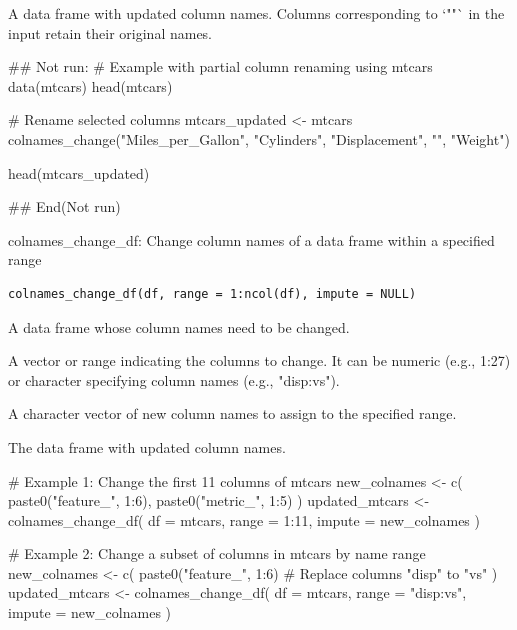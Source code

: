 \documentclass[a4paper]{book}
\begin{document}
%
\begin{Value}
A data frame with updated column names. Columns corresponding to `""` in the input retain their original names.
\end{Value}
%
\begin{Examples}
\begin{ExampleCode}
\#\# Not run: 
# Example with partial column renaming using mtcars
data(mtcars)
head(mtcars)

# Rename selected columns
mtcars_updated <- mtcars %
  colnames_change("Miles_per_Gallon", "Cylinders", "Displacement", "", "Weight")

head(mtcars_updated)

## End(Not run)

\end{ExampleCode}
\end{Examples}
%
\begin{Description}
colnames\_change\_df: Change column names of a data frame within a specified range
\end{Description}
%
\begin{Usage}
\begin{verbatim}
colnames_change_df(df, range = 1:ncol(df), impute = NULL)
\end{verbatim}
\end{Usage}
%
\begin{Arguments}
\begin{ldescription}
\item[\code{df}] A data frame whose column names need to be changed.

\item[\code{range}] A vector or range indicating the columns to change. It can be numeric (e.g., 1:27) or character specifying column names (e.g., "disp:vs").

\item[\code{impute}] A character vector of new column names to assign to the specified range.
\end{ldescription}
\end{Arguments}
%
\begin{Value}
The data frame with updated column names.
\end{Value}
%
\begin{Examples}
\begin{ExampleCode}
# Example 1: Change the first 11 columns of mtcars
new_colnames <- c(
  paste0("feature_", 1:6),
  paste0("metric_", 1:5)
)
updated_mtcars <- colnames_change_df(
  df = mtcars,
  range = 1:11,
  impute = new_colnames
)

# Example 2: Change a subset of columns in mtcars by name range
new_colnames <- c(
  paste0("feature_", 1:6)   # Replace columns "disp" to "vs"
)
updated_mtcars <- colnames_change_df(
  df = mtcars,
  range = "disp:vs",
  impute = new_colnames
)

\end{ExampleCode}
\end{Examples}
\end{document}
